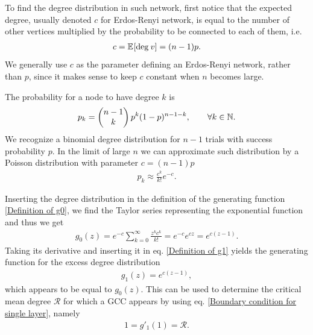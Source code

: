\documentclass[
11pt, %
american, %
singlespacing, %
final, %
nolistspacing, %
liststotoc, %
headsepline, %
]{MastersDoctoralThesis} %
\begin{document}
To find the degree distribution in such network, first notice that the expected degree, usually denoted $c$ for Erdos-Renyi network, is equal to the number of other vertices multiplied by the probability to be connected to each of them, i.e.
\begin{align}
	c = \mathbb{E}_{}\!\left[ \mathrm{deg}_{}\, v \right] = (n - 1) p.
\end{align}
We generally use $c$ as the parameter defining an Erdos-Renyi network, rather than $p$, since it makes sense to keep $c$ constant when $n$ becomes large. 

The probability for a node to have degree $k$ is
\begin{align}
	p_k = \begin{pmatrix} n-1 \\ k \end{pmatrix} p^k (1 - p)^{n - 1 - k}, \qquad \forall k \in \mathbb{N}. \label{Poisson degree distribution}
\end{align}
We recognize a binomial degree distribution for $n-1$ trials with success probability $p$. In the limit of large $n$ we can approximate such distribution by a Poisson distribution with parameter $c = (n - 1) p$
\begin{align}
	p_k \approx \frac{c^k}{k!} e^{-c}.  \label{pk for Erdos-Renyi}
\end{align}

Inserting the degree distribution in the definition of the generating function \eqref{Definition of g0}, we find the Taylor series representing the exponential function and thus we get
\begin{align}
	g_0(z) = e^{-c} \sum_{k = 0}^\infty \frac{z^k c^k}{k!} = e^{-c} e^{c z} = e^{c(z - 1)}. \label{g0 for ER networks}
\end{align}
Taking its derivative and inserting it in eq. \eqref{Definition of g1} yields the generating function for the excess degree distribution
\begin{align} 
	g_1(z) = e^{c(z - 1)},  \label{g1 for ER networks}
\end{align}
which appears to be equal to $g_0(z)$. This can be used to determine the critical mean degree $\mathcal{R}$ for which a GCC appears by using eq. \eqref{Boundary condition for single layer}, namely
\begin{align}
	1 = g'_1(1) = \mathcal{R}.
\end{align}
\end{document}
